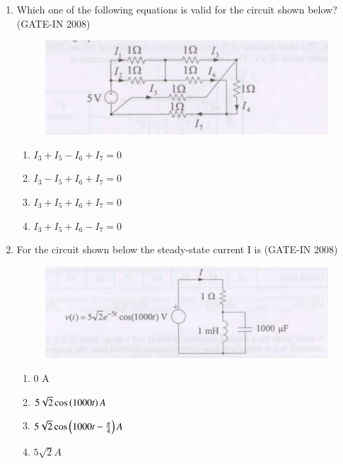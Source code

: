 \documentclass[journal,12pt,onecolumn]{IEEEtran}
\theoremstyle{remark}
\begin{document}
\begin{enumerate}
\begin{multicols}{4}
    \begin{enumerate} 
        \item 50 W
        \item 1050 W
        \item 5000 W
        \item 10100 W
    \end{enumerate}
    \end{multicols}
    
    \item Which one of the following equations is valid for the circuit shown below?  \hfill{(GATE-IN 2008)}

       \begin{figure}[H]
    \centering
    \includegraphics[width=0.5\columnwidth]{figs/i14.jpg}
    \caption{}
    \label{fig:placeholder14}
\end{figure}
\begin{multicols}{2}
    \begin{enumerate} 
        \item $I_3+ I_5- I_6+ I_7 = 0 $
        \item  $I_3- I_5+ I_6+ I_7 = 0 $
        \item $I_3+ I_5+ I_6+ I_7 = 0 $ 
        \item $I_3+ I_5+ I_6- I_7 = 0 $
    \end{enumerate}
    \end{multicols}
    
    \item  For the circuit shown below  the steady-state current I is \hfill{(GATE-IN 2008)}

   \begin{figure}[H]
    \centering
    \includegraphics[width=0.5\columnwidth]{figs/i15.jpg}
    \caption{}
    \label{fig:placeholder15}
\end{figure}
\begin{multicols}{4}
    \begin{enumerate} 
        \item 0 A 
        \item $5\sqrt{2} \cos\left(1000t\right) A$
        \item $5\sqrt{2} \cos\left(1000t - \frac{\pi}{4}\right) A$
        \item $5\sqrt{2} A$
    \end{enumerate}
    \end{multicols}
    

\end{enumerate}
\end{document}
